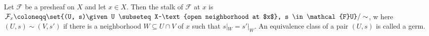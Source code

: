 Let $\mathcal{F}$ be a presheaf on $X$ and  let $x \in X$. Then the stalk of
$\mathcal{F}$ at $x$ is $\mathcal{F}_x\coloneqq\set{(U, s)\given U \subseteq X~\text{open neighborhood at $x$}, s \in \mathcal{F}U}/\sim$,
w here $(U, s)\sim (V, s')$ if there is a neighborhood $W \subseteq U\cap V$ of $x$ such that
$s|_W = s'|_W$. An equivalence class of a pair $(U, s)$ is called a germ.
